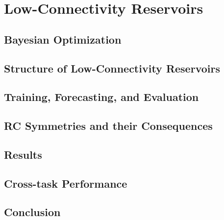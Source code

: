 \chapter{Low-Connectivity Reservoirs}\label{ch:low-connectivity}


\section{Bayesian Optimization}

\section{Structure of Low-Connectivity Reservoirs}

\section{Training, Forecasting, and Evaluation}

\section{RC Symmetries and their Consequences}

\section{Results}

\section{Cross-task Performance}

\section{Conclusion}
